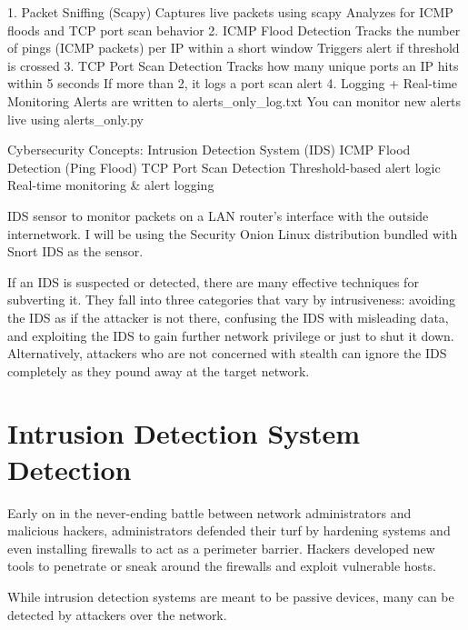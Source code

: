 
1. Packet Sniffing (Scapy)
    Captures live packets using scapy
    Analyzes for ICMP floods and TCP port scan behavior
2. ICMP Flood Detection
    Tracks the number of pings (ICMP packets) per IP within a short window
    Triggers alert if threshold is crossed
3. TCP Port Scan Detection
    Tracks how many unique ports an IP hits within 5 seconds
    If more than 2, it logs a port scan alert
4. Logging + Real-time Monitoring
    Alerts are written to alerts\_only\_log.txt
    You can monitor new alerts live using alerts\_only.py

Cybersecurity Concepts:
    Intrusion Detection System (IDS)
    ICMP Flood Detection (Ping Flood)
    TCP Port Scan Detection
    Threshold-based alert logic
    Real-time monitoring \& alert logging


IDS sensor to monitor packets on a LAN router’s interface with the outside internetwork. 
I will be using the Security Onion Linux distribution bundled with Snort IDS as the sensor.


If an IDS is suspected or detected, there are many effective techniques for subverting it. 
They fall into three categories that vary by intrusiveness: 
avoiding the IDS as if the attacker is not there, confusing the IDS with misleading data, and exploiting the IDS to 
gain further network privilege or just to shut it down. Alternatively, attackers who are not concerned with stealth 
can ignore the IDS completely as they pound away at the target network.

\section{Intrusion Detection System Detection}
Early on in the never-ending battle between network administrators and malicious hackers, administrators defended 
their turf by hardening systems and even installing firewalls to act as a perimeter barrier. 
Hackers developed new tools to penetrate or sneak around the firewalls and exploit vulnerable hosts.

While intrusion detection systems are meant to be passive devices, many can be detected by attackers over the network.

